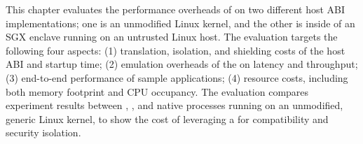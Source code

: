 This chapter evaluates the performance overheads of \graphene{}
on two different host ABI implementations;
one is an unmodified Linux kernel, and the other is inside of an SGX enclave running on an untrusted Linux host.
The evaluation
targets the following four aspects:
(1) translation, isolation, and shielding costs of the host ABI and startup time;
(2) emulation overheads of the \libos{} on \linuxapis{} latency and throughput;
(3) end-to-end performance of sample applications;
(4) resource costs, including both memory footprint and CPU occupancy.
The evaluation compares experiment results
between \graphene{}, \graphenesgx{}, and native processes running on an unmodified, generic Linux kernel,
to show the cost of leveraging a \libos{} for compatibility and security isolation.










